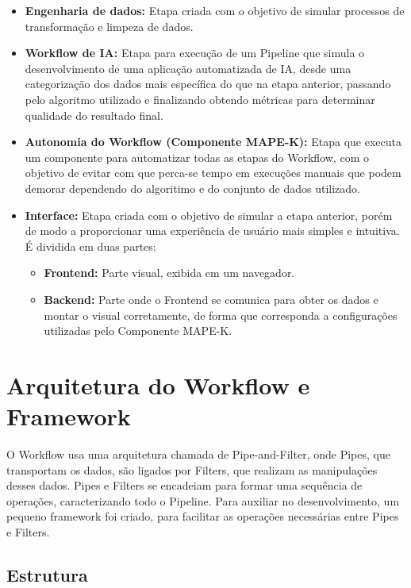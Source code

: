 \documentclass[portugues]{ic-tese}
\begin{document}
\begin{itemize}
    \item {\textbf{Engenharia de dados:}} Etapa criada com o objetivo de simular processos de transformação e limpeza de dados.
    \item {\textbf{Workflow de IA:}} Etapa para execução de um Pipeline que simula o desenvolvimento de uma aplicação automatizada de IA, desde uma categorização dos dados mais específica do que na etapa anterior, passando pelo algoritmo utilizado e finalizando obtendo métricas para determinar qualidade do resultado final.
    \item {\textbf{Autonomia do Workflow (Componente MAPE-K):}} Etapa que executa um componente para automatizar todas as etapas do Workflow, com o objetivo de evitar com que perca-se tempo em execuções manuais que podem demorar dependendo do algoritimo e do conjunto de dados utilizado.
    \item {\textbf{Interface:}} Etapa criada com o objetivo de simular a etapa anterior, porém de modo a proporcionar uma experiência de usuário mais simples e intuitiva. É dividida em duas partes:
    \begin{itemize}
        \item {\textbf{Frontend:}} Parte visual, exibida em um navegador.
        \item \textbf{{Backend:}} Parte onde o Frontend se comunica para obter os dados e montar o visual corretamente, de forma que corresponda a configurações utilizadas pelo Componente MAPE-K.
    \end{itemize}
\end{itemize}

\section{Arquitetura do Workflow e Framework}

O Workflow usa uma arquitetura chamada de Pipe-and-Filter, onde Pipes, que transportam os dados, são ligados por Filters, que realizam as manipulações desses dados. Pipes e Filters se encadeiam para formar uma sequência de operações, caracterizando todo o Pipeline. Para auxiliar no desenvolvimento, um pequeno framework foi criado, para facilitar as operações necessárias entre Pipes e Filters. 

\subsection{Estrutura}
\end{document}
